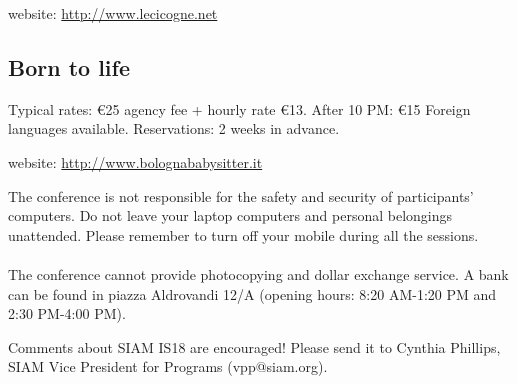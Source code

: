 \smallskip\noindent website: \href{http://www.lecicogne.net}{http://www.lecicogne.net}

\subsection*{Born to life}
Typical rates: \euro 25 agency fee + hourly rate \euro 13. After 10 PM: \euro 15 Foreign languages available. Reservations: 2 weeks in advance.

\smallskip\noindent website: \href{http://www.bolognababysitter.it}{http://www.bolognababysitter.it}

The conference is not responsible for the safety and security of participants' computers. Do not leave your laptop computers and personal belongings unattended. Please remember to turn off your mobile during all the sessions.\\\\ The conference cannot provide photocopying and dollar exchange service. A bank can be found in piazza Aldrovandi 12/A (opening hours: 8:20 AM-1:20 PM and 2:30 PM-4:00 PM).

Comments about SIAM IS18 are encouraged! Please send it to Cynthia Phillips, SIAM Vice President for Programs (vpp@siam.org).
